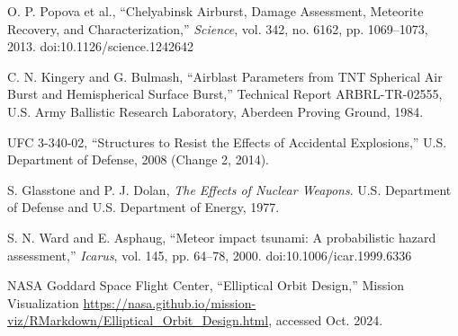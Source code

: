 \documentclass[conference]{IEEEtran}
\begin{document}
\begin{thebibliography}{00}
	O. P. Popova et al., ``Chelyabinsk Airburst, Damage Assessment, Meteorite Recovery, and Characterization,'' \textit{Science}, vol. 342, no. 6162, pp. 1069--1073, 2013. doi:10.1126/science.1242642

	C. N. Kingery and G. Bulmash, ``Airblast Parameters from TNT Spherical Air Burst and Hemispherical Surface Burst,'' Technical Report ARBRL-TR-02555, U.S. Army Ballistic Research Laboratory, Aberdeen Proving Ground, 1984.

	UFC 3-340-02, ``Structures to Resist the Effects of Accidental Explosions,'' U.S. Department of Defense, 2008 (Change 2, 2014).

	S. Glasstone and P. J. Dolan, \textit{The Effects of Nuclear Weapons}. U.S. Department of Defense and U.S. Department of Energy, 1977.

	S. N. Ward and E. Asphaug, ``Meteor impact tsunami: A probabilistic hazard assessment,'' \textit{Icarus}, vol. 145, pp. 64--78, 2000. doi:10.1006/icar.1999.6336

	NASA Goddard Space Flight Center, ``Elliptical Orbit Design,'' Mission Visualization \url{https://nasa.github.io/mission-viz/RMarkdown/Elliptical_Orbit_Design.html}, accessed Oct. 2024.

\end{thebibliography}
\end{document}
